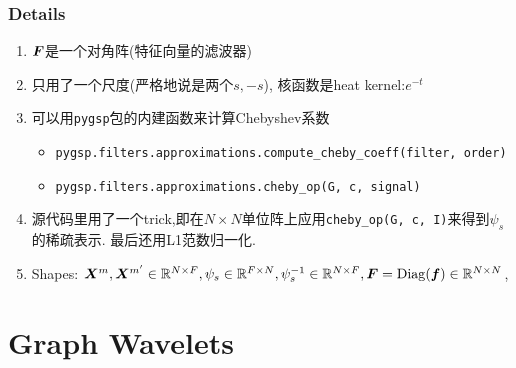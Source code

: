 \documentclass{article}
\begin{document}
\subsubsection{Details}
    
    \begin{enumerate}
        \item $\boldsymbol{F}$是一个对角阵(特征向量的滤波器)
        \item 只用了一个尺度(严格地说是两个$s,-s$), 核函数是heat kernel:$e^{-t}$
        \item 可以用\verb|pygsp|包的内建函数来计算Chebyshev系数\begin{itemize}
            \item \verb|pygsp.filters.approximations.compute_cheby_coeff(filter, order)|
            \item \verb|pygsp.filters.approximations.cheby_op(G, c, signal)|
        \end{itemize}
        \item 源代码里用了一个trick,即在$N\times N$单位阵上应用\verb|cheby_op(G, c, I)|来得到$\psi_s$的稀疏表示. 最后还用L1范数归一化.
        \item Shapes: $\boldsymbol{X}^m, \boldsymbol{X}^{m'}\in \mathbb{R}^{N\times F}, \psi_s\in \mathbb{R}^{F\times N}, \psi_s^{-1}\in \mathbb{R}^{N\times F}, \boldsymbol{F}=\operatorname{Diag}(\boldsymbol{f}) \in \mathbb{R}^{N\times N}$, 
    \end{enumerate}

\section{Graph Wavelets}
\end{document}

